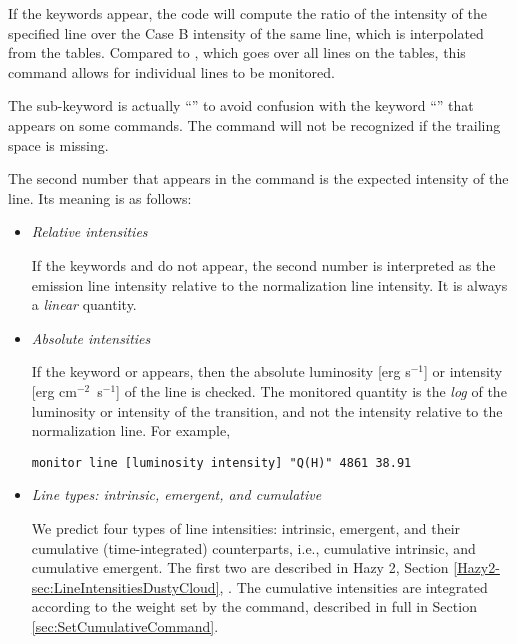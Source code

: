 If the keywords  appear,
the code will compute the ratio of the intensity of the specified line
over the Case B intensity of the same line, which is interpolated from
the \citet{Storey1995} tables.
Compared to ,
which goes over all lines on the tables,
this command allows for individual lines to be monitored.

The sub-keyword is actually ``'' to avoid
confusion with the keyword ``'' that appears
on some commands.
The command will not be recognized if the trailing space is missing.

The second number that appears in the command is the expected intensity of the line.
Its meaning is as follows:
%
\begin{itemize}

\item \emph{Relative intensities}

If the keywords  and  do not appear,
the second number is interpreted as the emission line intensity relative to the
normalization line intensity.
It is always a {\it linear} quantity.

\item \emph{Absolute intensities}

If the keyword  or  appears, then
the absolute luminosity [erg s$^{-1}$] or intensity [erg cm$^{-2}$~s$^{-1}$]
of the line is checked.
The monitored quantity is the {\it log} of the luminosity or intensity of
the transition, and not the intensity relative to the normalization line.
For example,
%
\begin{verbatim}
monitor line [luminosity intensity] "Q(H)" 4861 38.91
\end{verbatim}
%

\item \emph{Line types: intrinsic, emergent, and cumulative}

We predict four types of line intensities: intrinsic, emergent,
and their cumulative (time-integrated) counterparts, i.e.,
cumulative intrinsic, and cumulative emergent.
The first two are described in Hazy 2, Section
\ref{Hazy2-sec:LineIntensitiesDustyCloud}, 
.
The cumulative intensities are integrated according to the
weight set by the  command, described
in full in Section \ref{sec:SetCumulativeCommand}.


\end{itemize}
